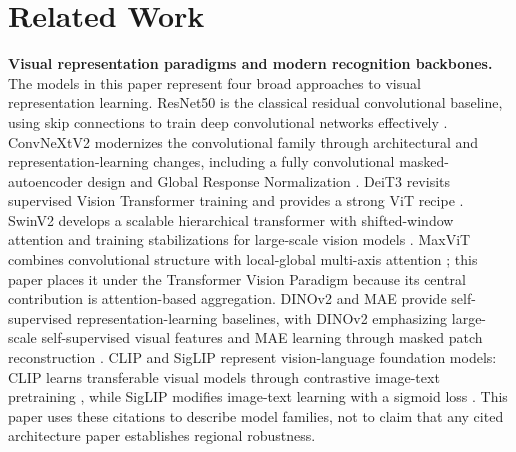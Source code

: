 \section{Related Work}

\noindent\textbf{Visual representation paradigms and modern recognition backbones.}
The models in this paper represent four broad approaches to visual representation learning. ResNet50 is the classical residual convolutional baseline, using skip connections to train deep convolutional networks effectively \citep{he2016resnet}. ConvNeXtV2 modernizes the convolutional family through architectural and representation-learning changes, including a fully convolutional masked-autoencoder design and Global Response Normalization \citep{woo2023convnextv2}. DeiT3 revisits supervised Vision Transformer training and provides a strong ViT recipe \citep{touvron2022deit3}. SwinV2 develops a scalable hierarchical transformer with shifted-window attention and training stabilizations for large-scale vision models \citep{liu2022swinv2}. MaxViT combines convolutional structure with local-global multi-axis attention \citep{tu2022maxvit}; this paper places it under the Transformer Vision Paradigm because its central contribution is attention-based aggregation. DINOv2 and MAE provide self-supervised representation-learning baselines, with DINOv2 emphasizing large-scale self-supervised visual features \citep{oquab2024dinov2} and MAE learning through masked patch reconstruction \citep{he2022mae}. CLIP and SigLIP represent vision-language foundation models: CLIP learns transferable visual models through contrastive image-text pretraining \citep{radford2021clip}, while SigLIP modifies image-text learning with a sigmoid loss \citep{zhai2023siglip}. This paper uses these citations to describe model families, not to claim that any cited architecture paper establishes regional robustness.

